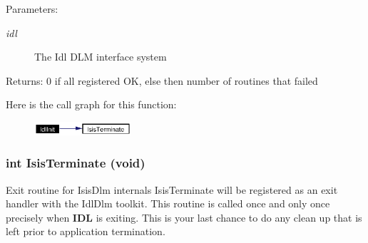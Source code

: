 \begin{Desc}
\item[Parameters:]
\begin{description}
\item[{\em idl}]The Idl DLM interface system \end{description}
\end{Desc}
\begin{Desc}
\item[Returns:]0 if all registered OK, else then number of routines that failed \end{Desc}


Here is the call graph for this function:\begin{figure}[H]
\begin{center}
\leavevmode
\includegraphics[width=102pt]{IsisDlm_8cpp_a2_cgraph}
\end{center}
\end{figure}
\subsubsection{\setlength{\rightskip}{0pt plus 5cm}int Isis\-Terminate (void)}\label{IsisDlm_8cpp_a1}


Exit routine for Isis\-Dlm internals Isis\-Terminate will be registered as an exit handler with the Idl\-Dlm toolkit. This routine is called once and only once precisely when {\bf IDL} is exiting. This is your last chance to do any clean up that is left prior to application termination. 